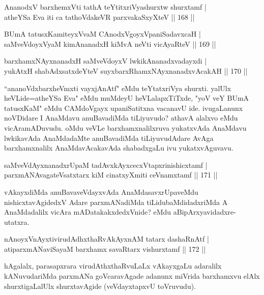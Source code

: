 \begin{shl}
AnanodxV barxhemxVti tathA teYtitxriVyashurxtw shurxtamf |\\
atheYSa Eva iti ca tathoVdakeVR parxvakaSxyXteV \hfill || 168 ||
\end{shl}

\begin{shl}
BUmA tatusxKamiteyxVvaM CAnodxVgoyxVpaniSadavxcaH |\\
saMveVdoyxV\s yaM kimAnanadxH kiMvA neVti vicAyaRteV \hfill || 169 ||
\end{shl}

\begin{shl}
barxhamxNAyxnanadxH saMveVdoyxV lwkikAnanadxvadayxdi |\\
yukAtxH shabAdxsatxdeYteV suyxbarxRhamxNAyxnanadxvAcakAH \hfill || 170 ||
\end{shl}

\begin{artha}
``ananoVdxbarxheVmxti vayxjAnAtf" eMdu teYtatxriVya shurxti. yalUlx heVLide=atheYSa Eva" eMdu muMdeyU heVLalapxTiTxde, "yoV veY BUmA tatusxKaM" eMdu CAMdoVgayx upaniSatitxna vacanavU ide. ivugaLanunx noVDidare I AnaMdavu anuBavadiMda tiLiyuvudo? athavA alalxvo eMdu vicAramADuvudu. oMdu veVLe barxhamxnalilxruva yukatxvAda AnaMdavu lwkikavAda AnaMdadaMte anuBavadiMda tiLiyuvudAdare AvAga barxhamxnalilx AnaMdavAcakavAda shabadxgaLu ivu yukatxvAguvavu.
\end{artha}


\begin{shl}
saMveVdAyxnanadxrUpaM tadAvxkAyxcecxVtapxrinishicxtamf |\\
parxmANAvagateVsatxtarx kiM cinatxyXmiti ceVnamxtamf \hfill || 171 ||
\end{shl}

\begin{artha}
vAkayxdiMda anuBavaveVdayxvAda AnaMdasavxrUpaveMdu nishicxtavAgidedxV Adare parxmANadiMda tiLidubaMdidadxriMda A AnaMdadalilx vicAra mADatakakxdedxVnide? eMdu aBipArxyavidadxre- utatxra.
\end{artha}%

\begin{shl}
nAnoyxVnAyxtivirudAdhxthaRvAkAyxnAM tatarx dashaRnAtf |\\
atiparxmANaviSayaM barxhamx savaRtarx vishurxtamf \hfill || 172 ||
\end{shl}

\begin{artha}
hAgalalx, parasapxrara virudAthxthaRvuLaLx vAkayxgaLu adaralilx kANuvudariMda parxmANa goVcaravAgade adanunx miVrida barxhamxvu elAlx shurxtigaLalUlx shurxtavAgide (veVdayxtapxvU toVruvudu).
\end{artha}

